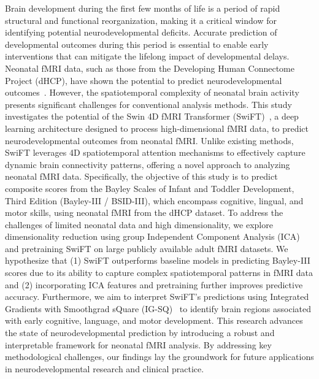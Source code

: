 \documentclass[runningheads,a4paper]{llncs}
\begin{document}
Brain development during the first few months of life is a period of rapid structural and functional reorganization, making it a critical window for identifying potential neurodevelopmental deficits. Accurate prediction of developmental outcomes during this period is essential to enable early interventions that can mitigate the lifelong impact of developmental delays. Neonatal fMRI data, such as those from the Developing Human Connectome Project (dHCP), have shown the potential to predict neurodevelopmental outcomes~\cite{LI2024114168}. However, the spatiotemporal complexity of neonatal brain activity presents significant challenges for conventional analysis methods.
%
This study investigates the potential of the Swin 4D fMRI Transformer (SwiFT)~\cite{kim2023swiftswin4dfmri}, a deep learning architecture designed to process high-dimensional fMRI data, to predict neurodevelopmental outcomes from neonatal fMRI. Unlike existing methods, SwiFT leverages 4D spatiotemporal attention mechanisms to effectively capture dynamic brain connectivity patterns, offering a novel approach to analyzing neonatal fMRI data. Specifically, the objective of this study is to predict composite scores from the Bayley Scales of Infant and Toddler Development, Third Edition (Bayley-III / BSID-III), which encompass cognitive, lingual, and motor skills, using neonatal fMRI from the dHCP dataset. To address the challenges of limited neonatal data and high dimensionality, we explore dimensionality reduction using group Independent Component Analysis (ICA) and pretraining SwiFT on large publicly available adult fMRI datasets. 
%
We hypothesize that (1) SwiFT outperforms baseline models in predicting Bayley-III scores due to its ability to capture complex spatiotemporal patterns in fMRI data and (2) incorporating ICA features and pretraining further improves predictive accuracy. Furthermore, we aim to interpret SwiFT's predictions using Integrated Gradients with Smoothgrad sQuare (IG-SQ)~\cite{captum1} to identify brain regions associated with early cognitive, language, and motor development. 
%
This research advances the state of neurodevelopmental prediction by introducing a robust and interpretable framework for neonatal fMRI analysis. By addressing key methodological challenges, our findings lay the groundwork for future applications in neurodevelopmental research and clinical practice.

\end{document}
